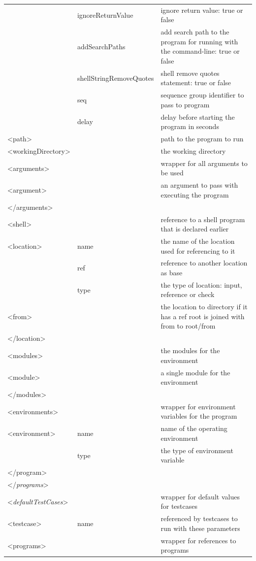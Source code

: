 \documentclass{deltares_memo}
\begin{document}
\begin{longtable}{p{30mm}p{45mm}p{\textwidth - 75mm - 36pt}}
     & ignoreReturnValue & ignore return value: true or false \\
     & addSearchPaths & add search path to the program for running with the command-line: true or false \\
     & shellStringRemoveQuotes & shell remove quotes statement: true or false \\
     & seq & sequence group identifier to pass to program \\
     & delay & delay before starting the program in seconds \\
<path> & & path to the program to run \\
<workingDirectory> & & the working directory \\
<arguments> & & wrapper for all arguments to be used \\
<argument> & & an argument to pass with executing the program \\
</arguments> & & \\
<shell> & & reference to a shell program that is declared earlier \\
<location> & name & the name of the location used for referencing to it \\
     & ref & reference to another location as base \\
     & type & the type of location: input, reference or check \\
<from> & & the location to directory if it has a ref root is joined with from to root/from \\
</location> & & \\
<modules> & & the modules for the environment \\
<module> & & a single module for the environment \\
</modules> & & \\
<environments> & & wrapper for environment variables for the program \\
<environment> & name & name of the operating environment \\
     & type & the type of environment variable \\
 </program> & & \\
</\emph{programs}> & & \\
\hline
<\emph{defaultTestCases}> & & wrapper for default values for testcases\\
<testcase> & name & referenced by testcases to run with these parameters \\
<programs> & & wrapper for references to programs \\

\end{longtable}
\end{document}

